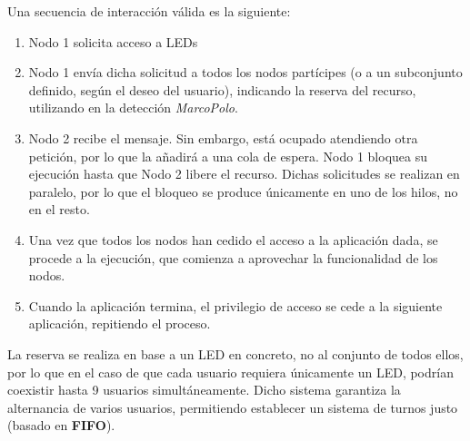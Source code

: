\documentclass{article}
\begin{document}
Una secuencia de interacción válida es la siguiente:

\begin{enumerate}
 \item Nodo 1 solicita acceso a LEDs
 \item Nodo 1 envía dicha solicitud a todos los nodos partícipes (o a un subconjunto definido, según el deseo del usuario), indicando la reserva del recurso, utilizando en la detección \textit{MarcoPolo}.
 \item Nodo 2 recibe el mensaje. Sin embargo, está ocupado atendiendo otra petición, por lo que la añadirá a una cola de espera. Nodo 1 bloquea su ejecución hasta que Nodo 2 libere el recurso. Dichas solicitudes se realizan en paralelo, por lo que el bloqueo se produce únicamente en uno de los hilos, no en el resto.
 \item Una vez que todos los nodos han cedido el acceso a la aplicación dada, se procede a la ejecución, que comienza a aprovechar la funcionalidad de los nodos.
 \item Cuando la aplicación termina, el privilegio de acceso se cede a la siguiente aplicación, repitiendo el proceso.
\end{enumerate}

La reserva se realiza en base a un LED en concreto, no al conjunto de todos ellos, por lo que en el caso de que cada usuario requiera únicamente un LED, podrían coexistir hasta 9 usuarios simultáneamente.
Dicho sistema garantiza la alternancia de varios usuarios, permitiendo establecer un sistema de turnos justo (basado en \textbf{FIFO}).






 \label{Bibliography}
\end{document}

